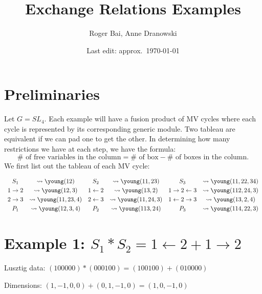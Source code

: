 \documentclass{article}
\title{Exchange Relations Examples}
\author{Roger Bai, Anne Dranowski}
\date{Last edit: approx.\ \today}
\begin{document}
\maketitle
\tableofcontents

\section*{Preliminaries}
Let $G = SL_4$. Each example will have a fusion product of MV cycles where each cycle is represented by its corresponding generic module. Two tableau are equivalent if we can pad one to get the other. In determining how many restrictions we have at each step, we have the formula:
$$ \#\text{ of free variables in the column} = \#\text{ of box} - \#\text{ of boxes in the column}.$$
We first list out the tableau of each MV cycle:

\[\begin{array}{cccccc} \vspace{1mm}
    S_1 &\leadsto \young(12) & S_2 &\leadsto \young(11,23) & S_3 &\leadsto \young(11,22,34) \\ \vspace{1mm}
    1 \rightarrow 2 &\leadsto \young(12,3) & 1 \leftarrow 2 &\leadsto \young(13,2) & 1 \rightarrow 2 \leftarrow 3 &\leadsto \young(112,24,3) \\ \vspace{1mm}
    2 \rightarrow 3 &\leadsto \young(11,23,4) & 2 \leftarrow 3 &\leadsto \young(11,24,3) & 1 \leftarrow 2 \rightarrow 3 &\leadsto \young(13,2,4) \\
    P_1 &\leadsto \young(12,3,4) & P_2 &\leadsto \young(113,24) & P_3 &\leadsto \young(114,22,3)
\end{array}\]

\section{Example 1: $S_1 * S_2 = 1 \leftarrow 2 + 1 \rightarrow 2$}
Lusztig data: $(100000) * (000100) = (100100) + (010000)$

Dimensions: $(1,-1,0,0) + (0,1,-1,0) = (1,0,-1,0)$
\end{document}
